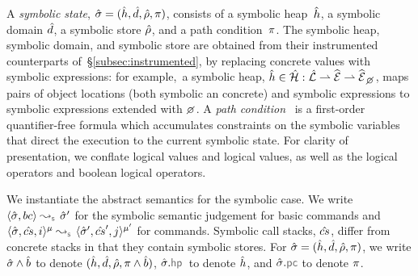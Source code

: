 A \emph{symbolic state}, $\hat{\sigma} = (\hat{h}, \hat{d}, \hat\rho, \pi)$, consists of a 
symbolic heap~$\hat{h}$, a symbolic domain $\hat{d}$, a symbolic store $\hat\rho$, and a path condition~$\pi$. 
The symbolic heap, symbolic domain, and symbolic store are obtained from their instrumented 
counterparts of~\S\ref{subsec:instrumented}, by replacing concrete values with symbolic expressions: for example,~a symbolic heap, $\sheap \in \sheaps : \slocs \partialmap \sexprs \partialmap \setext{\sexprs}{\none}$,
 maps pairs of object locations (both symbolic an concrete) and symbolic expressions to symbolic expressions
extended with $\none$. 
A \emph{path condition}~\cite{symb:exec:survey} is a first-order quantifier-free formula which
 accumulates constraints on the symbolic variables that direct 
the execution to the current symbolic state.
For clarity of presentation, we conflate \jsil logical values and logical values, as well as the \jsil logical operators and boolean logical operators.

We instantiate the abstract semantics for the symbolic case.  
We write $\absbsemrule{\sstate, \bcmd}{\sstate'}{\symbolic}$ for the symbolic semantic 
judgement for basic commands and $\abssemrule{\sstate, \scs, i}{\sstate', \scs', j}{\mode}{\mode'}{\symbolic}$ 
for commands. Symbolic call stacks, $\hat{cs}$, differ from concrete stacks in that they contain symbolic stores.
For $\hat{\sigma} = (\hat{h}, \hat{d}, \hat\rho, \pi)$, we write $\hat{\sigma} \wedge \hat{b}$ to denote $(\hat{h}, \hat{d}, \hat\rho, \pi \wedge \hat{b})$, 
$\sstate.\hpsel$ to denote $\hat{h}$, and $\sstate.\pcsel\!$ to denote $\pi$.


